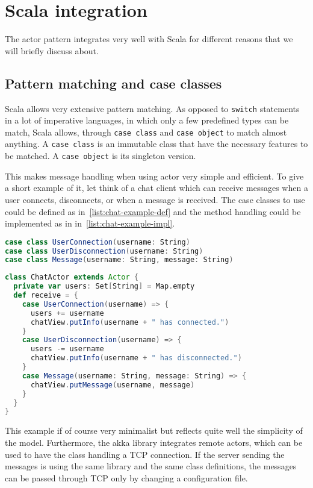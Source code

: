 \section{Scala integration}
The actor pattern integrates very well with Scala for different reasons that 
we will briefly discuss about.
\subsection{Pattern matching and case classes}
Scala allows very extensive pattern matching. As opposed to \lstinline{switch} 
statements in a lot of imperative languages, in which only a few predefined types 
can be match, Scala allows, through \lstinline{case class} and \lstinline{case object}
to match almost anything. 
A \lstinline{case class} is an immutable class that have the 
necessary features to be matched. A \lstinline{case object} is its singleton version.

This makes message handling when using actor very simple and efficient. 
To give a short example of it, let think of a chat client which can receive messages 
when a user connects, disconnects, or when a message is received. 
The case classes to use could be defined as in~\ref{list:chat-example-def} and the 
method handling could be implemented as in in~\ref{list:chat-example-impl}.
%
\begin{lstlisting}[basicstyle=\footnotesize,caption=Chat example definitions,label=list:chat-example-def,language=scala]
case class UserConnection(username: String)
case class UserDisconnection(username: String)
case class Message(username: String, message: String)
\end{lstlisting}
%
\begin{lstlisting}[basicstyle=\footnotesize,caption=Chat example implementation,label=list:chat-example-impl,language=scala]
class ChatActor extends Actor {
  private var users: Set[String] = Map.empty
  def receive = {
    case UserConnection(username) => {
      users += username
      chatView.putInfo(username + " has connected.")
    }
    case UserDisconnection(username) => {
      users -= username
      chatView.putInfo(username + " has disconnected.")
    }
    case Message(username: String, message: String) => {
      chatView.putMessage(username, message)
    }
  }
}
\end{lstlisting}
%
This example if of course very minimalist but reflects quite well the simplicity of the 
model. Furthermore, the akka library integrates remote actors, which can be used to have 
the class handling a TCP connection. If the server sending the messages is using the same 
library and the same class definitions, the messages can be passed through TCP only by 
changing a configuration file.
%
